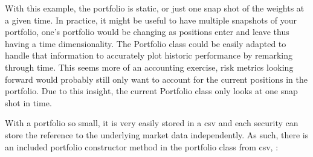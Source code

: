 \documentclass[letterpaper,10pt,english]{sphinxmanual}
\begin{document}
\sphinxAtStartPar
With this example, the portfolio is static, or just one snap shot of the
weights at a given time. In practice, it might be useful to have
multiple snapshots of your portfolio, one’s portfolio would be changing
as positions enter and leave thus having a time dimensionality. The
Portfolio class could be easily adapted to handle that information to
accurately plot historic performance by remarking through time. This
seems more of an accounting exercise, risk metrics looking forward would
probably still only want to account for the current positions in the
portfolio. Due to this insight, the current Portfolio class only looks
at one snap shot in time.

\sphinxAtStartPar
With a portfolio so small, it is very easily stored in a csv and each
security can store the reference to the underlying market data
independently. As such, there is an included portfolio constructor
method in the portfolio class from csv, :

\begin{sphinxVerbatim}[commandchars=\\\{\}]
   
  
  
\PYG{p}{[}\PYG{p}{]}
\end{sphinxVerbatim}
\end{document}
